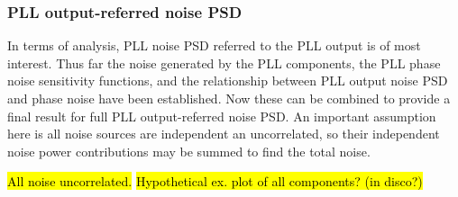 	\subsubsection{PLL output-referred noise PSD}
	In terms of analysis, PLL noise PSD referred to the PLL output is of most interest. Thus far the noise generated by the PLL components, the PLL phase noise sensitivity functions, and the relationship between PLL output noise PSD and phase noise have been established. Now these can be combined to provide a final result for full PLL output-referred noise PSD. An important assumption here is all noise sources are independent an uncorrelated, so their independent noise power contributions may be summed to find the total noise.



	\hl{All noise uncorrelated.}
	\hl{Hypothetical ex. plot of all components? (in disco?)}



